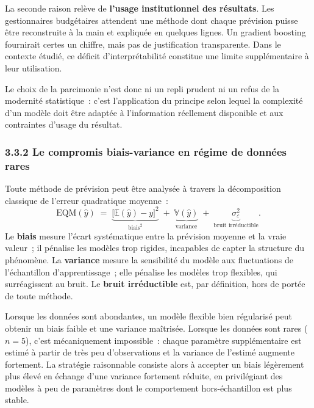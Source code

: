 La seconde raison rel\`eve de \textbf{l'usage institutionnel des r\'esultats}.
Les gestionnaires budg\'etaires attendent une m\'ethode dont chaque pr\'evision
puisse \^etre reconstruite \`a la main et expliqu\'ee en quelques lignes. Un
gradient boosting fournirait certes un chiffre, mais pas de justification
transparente. Dans le contexte \'etudi\'e, ce d\'eficit d'interpr\'etabilit\'e
constitue une limite suppl\'ementaire \`a leur utilisation.

Le choix de la parcimonie n'est donc ni un repli prudent ni un refus de la
modernit\'e statistique~: c'est l'application du principe selon lequel la
complexit\'e d'un mod\`ele doit \^etre adapt\'ee \`a l'information r\'eellement
disponible et aux contraintes d'usage du r\'esultat.

\subsubsection*{3.3.2 \quad Le compromis biais-variance en r\'egime de donn\'ees rares}

Toute m\'ethode de pr\'evision peut \^etre analys\'ee \`a travers la
d\'ecomposition classique de l'erreur quadratique moyenne~:
$$
\mathrm{EQM}(\hat{y}) \;=\; \underbrace{\bigl[\mathbb{E}(\hat{y}) - y\bigr]^2}_{\text{biais}^2}
\;+\; \underbrace{\mathbb{V}(\hat{y})}_{\text{variance}}
\;+\; \underbrace{\sigma_\varepsilon^2}_{\text{bruit irr\'eductible}}.
$$
Le \textbf{biais} mesure l'\'ecart syst\'ematique entre la pr\'evision moyenne
et la vraie valeur~; il p\'enalise les mod\`eles trop rigides, incapables de
capter la structure du ph\'enom\`ene. La \textbf{variance} mesure la
sensibilit\'e du mod\`ele aux fluctuations de l'\'echantillon
d'apprentissage~; elle p\'enalise les mod\`eles trop flexibles, qui
surr\'eagissent au bruit. Le \textbf{bruit irr\'eductible} est, par
d\'efinition, hors de port\'ee de toute m\'ethode.

Lorsque les donn\'ees sont abondantes, un mod\`ele flexible bien
r\'egularis\'e peut obtenir un biais faible et une variance ma\^itris\'ee.
Lorsque les donn\'ees sont rares ($n=5$), c'est m\'ecaniquement impossible~:
chaque param\`etre suppl\'ementaire est estim\'e \`a partir de tr\`es peu
d'observations et la variance de l'estim\'e augmente fortement. La
strat\'egie raisonnable consiste alors \`a accepter un biais l\'eg\`erement
plus \'elev\'e en \'echange d'une variance fortement r\'eduite, en privil\'egiant
des mod\`eles \`a peu de param\`etres dont le comportement hors-\'echantillon
est plus stable.

